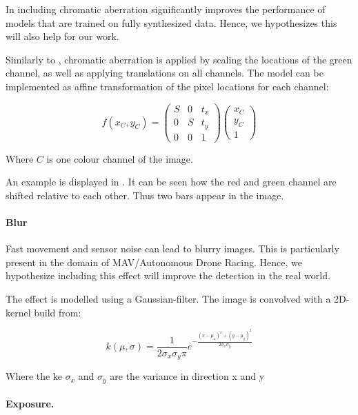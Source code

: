 In \cite{Carlson2018} including chromatic aberration significantly improves the performance of models that are trained on fully synthesized data. Hence, we hypothesizes this will also help for our work.

Similarly to \cite{Carlson2018}, chromatic aberration is applied by scaling the locations of the green channel, as well as applying translations on all channels. The model can be implemented as affine transformation of the pixel locations for each channel:

\begin{equation}
f(x_C,y_C) = \begin{pmatrix}
S & 0 & t_x \\
0 & S & t_y \\
0 & 0 & 1
\end{pmatrix} \begin{pmatrix}
x_C \\
y_C \\
1
\end{pmatrix}
\end{equation}

Where $C$ is one colour channel of the image.

An example is displayed in . It can be seen how the red and green channel are shifted relative to each other. Thus two bars appear in the image.

\paragraph{Blur}

Fast movement and sensor noise can lead to blurry images. This is particularly present in the domain of \ac{MAV}/Autonomous Drone Racing. Hence, we hypothesize including this effect will improve the detection in the real world. 

The effect is modelled using a Gaussian-filter. The image is convolved with a 2D-kernel build from:

\begin{equation}
k(\mu,\sigma) = \frac{1}{2\sigma_x\sigma_y\pi}e^{-{\frac{(x-\mu_x)^2 + (y-\mu_y)^2}{2\sigma_x\sigma_y}}} 
\end{equation}

Where the ke $\sigma_x$ and $\sigma_y$ are the variance in direction x and y

\paragraph{Exposure.}

